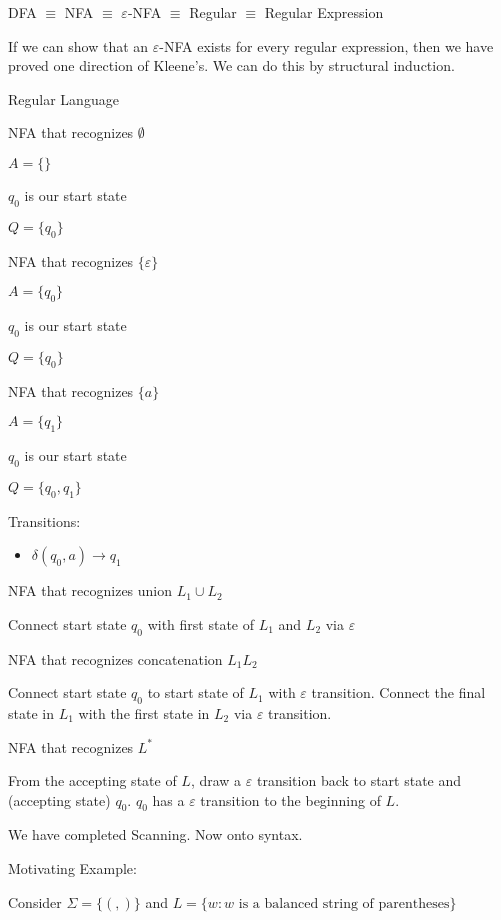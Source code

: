 \documentclass{article}
\begin{document}
DFA \(\equiv\) NFA \(\equiv\) \(\varepsilon\)-NFA \(\equiv\) Regular
\(\equiv\) Regular Expression

If we can show that an \(\varepsilon\)-NFA exists for every regular
expression, then we have proved one direction of Kleene's. We can do
this by structural induction.

Regular Language

NFA that recognizes \(\emptyset\)

\(A = \{\}\)

\(q_0\) is our start state

\(Q = \{q_0\}\)

NFA that recognizes \(\{\varepsilon\}\)

\(A = \{q_0\}\)

\(q_0\) is our start state

\(Q = \{q_0\}\)

NFA that recognizes \(\{a\}\)

\(A = \{q_1\}\)

\(q_0\) is our start state

\(Q = \{q_0, q_1\}\)

Transitions:
\begin{itemize}
    \item \(\delta(q_0, a) \to q_1\)    
\end{itemize}

NFA that recognizes union \(L_1 \cup L_2\)

Connect start state \(q_0\) with first state of \(L_1\) and \(L_2\) via
\(\varepsilon\)

NFA that recognizes concatenation \(L_1 L_2\)

Connect start state \(q_0\) to start state of \(L_1\) with
\(\varepsilon\) transition. Connect the final state in \(L_1\) with the
first state in \(L_2\) via \(\varepsilon\) transition.

NFA that recognizes \(L^*\)

From the accepting state of \(L\), draw a \(\varepsilon\) transition
back to start state and (accepting state) \(q_0\). \(q_0\) has a
\(\varepsilon\) transition to the beginning of \(L\).

We have completed Scanning. Now onto syntax.

Motivating Example:

Consider \(\Sigma = \{(,)\}\) and
\(L = \{w : w \text{ is a balanced string of parentheses}\}\)

\end{document}
